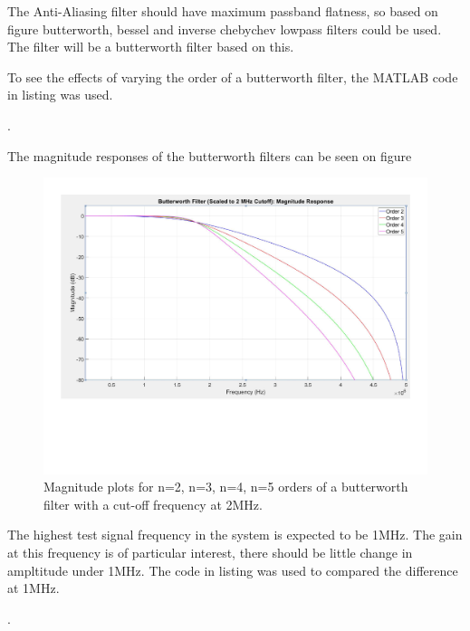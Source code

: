 The Anti-Aliasing filter should have maximum passband flatness, so based on figure  butterworth, bessel and inverse chebychev lowpass filters could be used. The filter will be a butterworth filter based on this.

To see the effects of varying the order of a butterworth filter, the MATLAB code in listing  was used.

. 

The magnitude responses of the butterworth filters can be seen on figure 
\begin{figure}[H]
    \centering
    \includegraphics[clip, trim=0 150 0 0, width=1\textwidth]{Appendix/Figures/A_FILT_BUT_MAG.pdf}
    \caption{Magnitude plots for n=2, n=3, n=4, n=5 orders of a butterworth filter with a cut-off frequency at 2MHz.}
    \label{fig:A_FILT_MAG_BUT}
\end{figure}

The highest test signal frequency in the system is expected to be 1MHz. The gain at this frequency is of particular interest, there should be little change in ampltitude under 1MHz. The code in listing  was used to compared the difference at 1MHz.

. 

